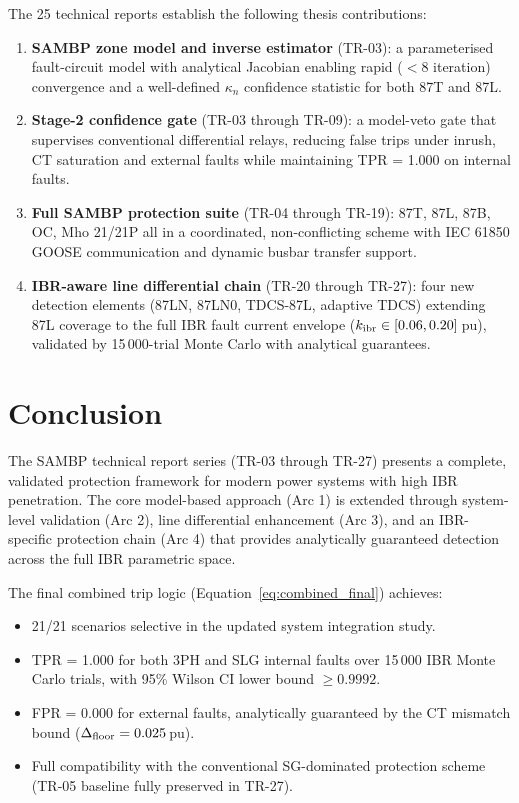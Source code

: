 \documentclass[11pt,a4paper]{article}
\begin{document}
The 25 technical reports establish the following thesis contributions:

\begin{enumerate}
  \item \textbf{SAMBP zone model and inverse estimator} (TR-03): a
    parameterised fault-circuit model with analytical Jacobian enabling
    rapid ($<$8 iteration) convergence and a well-defined $\kappa_n$
    confidence statistic for both 87T and 87L.

  \item \textbf{Stage-2 confidence gate} (TR-03 through TR-09):
    a model-veto gate that supervises conventional differential relays,
    reducing false trips under inrush, CT saturation and
    external faults while maintaining TPR = 1.000 on internal faults.

  \item \textbf{Full SAMBP protection suite} (TR-04 through TR-19):
    87T, 87L, 87B, OC, Mho 21/21P all in a coordinated, non-conflicting
    scheme with IEC 61850 GOOSE communication and dynamic busbar transfer
    support.

  \item \textbf{IBR-aware line differential chain} (TR-20 through TR-27):
    four new detection elements (87LN, 87LN0, TDCS-87L, adaptive TDCS)
    extending 87L coverage to the full IBR fault current envelope
    ($k_{\rm ibr} \in [0.06, 0.20]$\,pu), validated by 15\,000-trial
    Monte Carlo with analytical guarantees.
\end{enumerate}

\section{Conclusion}

The SAMBP technical report series (TR-03 through TR-27) presents a
complete, validated protection framework for modern power systems with
high IBR penetration.  The core model-based approach (Arc 1) is extended
through system-level validation (Arc 2), line differential enhancement
(Arc 3), and an IBR-specific protection chain (Arc 4) that provides
analytically guaranteed detection across the full IBR parametric space.

The final combined trip logic (Equation~\eqref{eq:combined_final}) achieves:
\begin{itemize}
  \item 21/21 scenarios selective in the updated system integration study.
  \item TPR = 1.000 for both 3PH and SLG internal faults over 15\,000 IBR
    Monte Carlo trials, with 95\% Wilson CI lower bound $\geq 0.9992$.
  \item FPR = 0.000 for external faults, analytically guaranteed by the
    CT mismatch bound ($\Delta_{\rm floor} = 0.025$\,pu).
  \item Full compatibility with the conventional SG-dominated protection
    scheme (TR-05 baseline fully preserved in TR-27).
\end{itemize}



\end{document}
